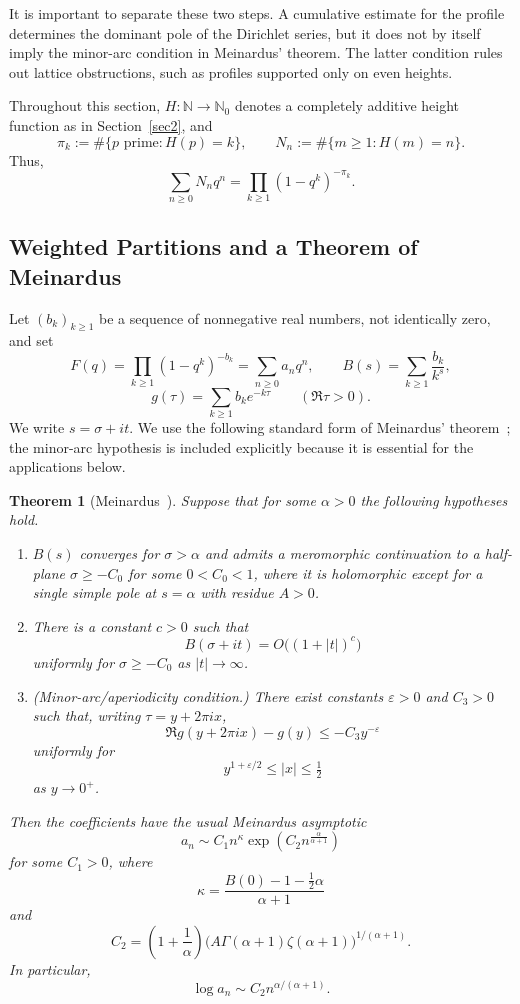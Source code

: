 \documentclass[11pt]{article}
\newtheorem{theorem}{Theorem}
\theoremstyle{definition}
\begin{document}
It is important to separate these two steps.  A cumulative estimate for the
profile determines the dominant pole of the Dirichlet series, but it does not by
itself imply the minor-arc condition in Meinardus' theorem.  The latter condition
rules out lattice obstructions, such as profiles supported only on even heights.

Throughout this section, $H:\mathbb N\to\mathbb N_0$ denotes a completely
additive height function as in Section~\ref{sec2}, and
\[
  \pi_k:=\#\{p\text{ prime}:H(p)=k\},
  \qquad
  N_n:=\#\{m\ge1:H(m)=n\}.
\]
Thus,
\[
  \sum_{n\ge0}N_nq^n
  =
  \prod_{k\ge1}(1-q^k)^{-\pi_k}.
\]

\subsection{Weighted Partitions and a Theorem of Meinardus}

Let $(b_k)_{k\ge1}$ be a sequence of nonnegative real numbers, not identically
zero, and set
\[
  F(q)=\prod_{k\ge1}(1-q^k)^{-b_k}=\sum_{n\ge0}a_nq^n,
  \qquad
  B(s)=\sum_{k\ge1}\frac{b_k}{k^s},
\]
\[
  g(\tau)=\sum_{k\ge1}b_ke^{-k\tau}\qquad(\Re\tau>0).
\]
We write $s=\sigma+it$.  We use the following standard form of Meinardus'
theorem~\cite{meinardus}; the minor-arc hypothesis is included explicitly
because it is essential for the applications below.

\begin{theorem}[Meinardus~\cite{meinardus}]
\label{thm:Meinardus}
Suppose that for some $\alpha>0$ the following hypotheses hold.
\begin{enumerate}
  \item[\textup{(M1)}]
  $B(s)$ converges for $\sigma>\alpha$ and admits a meromorphic continuation to
  a half-plane $\sigma\ge -C_0$ for some $0<C_0<1$, where it is holomorphic
  except for a single simple pole at $s=\alpha$ with residue $A>0$.
  \item[\textup{(M2)}]
  There is a constant $c>0$ such that
  \[
    B(\sigma+it)=O\bigl((1+|t|)^c\bigr)
  \]
  uniformly for $\sigma\ge -C_0$ as $|t|\to\infty$.
  \item[\textup{(M3)}]
  \textup{(Minor-arc/aperiodicity condition.)} There exist constants
  $\varepsilon>0$ and $C_3>0$ such that, writing $\tau=y+2\pi ix$,
  \[
    \Re g(y+2\pi ix)-g(y)\le -C_3y^{-\varepsilon}
  \]
  uniformly for
  \[
    y^{1+\varepsilon/2}\le |x|\le \tfrac12
  \]
  as $y\to0^+$.
\end{enumerate}
Then the coefficients have the usual Meinardus asymptotic
\[
  a_n\sim C_1n^\kappa
  \exp\!\left(C_2n^{\frac{\alpha}{\alpha+1}}\right)
\]
for some $C_1>0$, where
\[
  \kappa=\frac{B(0)-1-\tfrac12\alpha}{\alpha+1}
\]
and
\begin{equation*}
  C_2=
  \left(1+\frac1\alpha\right)
  \bigl(A\Gamma(\alpha+1)\zeta(\alpha+1)\bigr)^{1/(\alpha+1)}.
\end{equation*}
In particular,
\[
  \log a_n\sim C_2n^{\alpha/(\alpha+1)}.
\]
\end{theorem}
\end{document}
